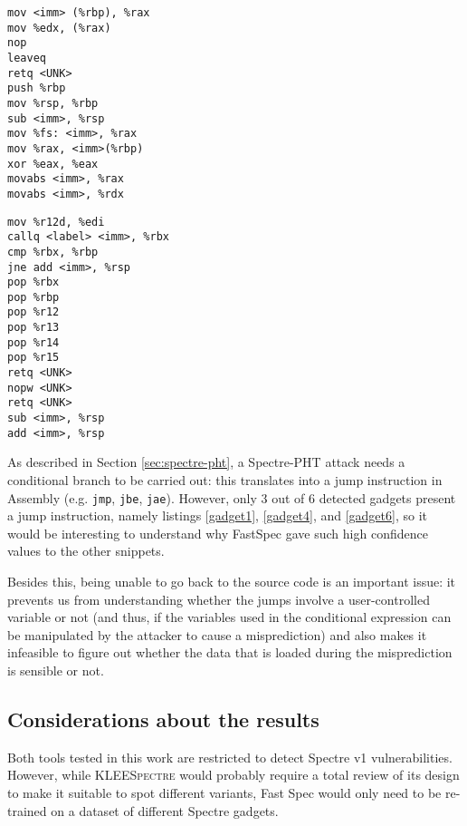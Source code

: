 \documentclass[12pt,a4paper]{book}
\theoremstyle{definition}
\begin{document}
	\begin{minipage}{.45\textwidth}
		\begin{lstlisting}[caption={Window 11598-11601}, label=gadget5]
mov <imm> (%rbp), %rax
mov %edx, (%rax)
nop
leaveq
retq <UNK>
push %rbp
mov %rsp, %rbp
sub <imm>, %rsp
mov %fs: <imm>, %rax
mov %rax, <imm>(%rbp)
xor %eax, %eax
movabs <imm>, %rax
movabs <imm>, %rdx
		\end{lstlisting}
	\end{minipage}\hfill
	\begin{minipage}{.45\textwidth}
		\begin{lstlisting}[basicstyle=\footnotesize\ttfamily, caption={Window 11868-11902}, label=gadget6, numbers=right]
mov %r12d, %edi
callq <label> <imm>, %rbx
cmp %rbx, %rbp
jne add <imm>, %rsp
pop %rbx
pop %rbp
pop %r12
pop %r13
pop %r14
pop %r15
retq <UNK>
nopw <UNK>
retq <UNK>
sub <imm>, %rsp
add <imm>, %rsp
		\end{lstlisting}
	\end{minipage}
	\vspace{3mm}
	
	As described in Section \ref{sec:spectre-pht}, a Spectre-PHT attack needs a conditional branch to be carried out: this translates into a jump instruction in Assembly (e.g. \texttt{jmp}, \texttt{jbe}, \texttt{jae}). However, only 3 out of 6 detected gadgets present a jump instruction, namely listings \ref{gadget1}, \ref{gadget4}, and \ref{gadget6}, so it would be interesting to understand why FastSpec gave such high confidence values to the other snippets. 
	
	Besides this, being unable to go back to the source code is an important issue: it prevents us from understanding whether the jumps involve a user-controlled variable or not (and thus, if the variables used in the conditional expression can be manipulated by the attacker to cause a misprediction) and also makes it infeasible to figure out whether the data that is loaded during the misprediction is sensible or not. 
	\subsection{Considerations about the results}\label{sec:final}
	Both tools tested in this work are restricted to detect Spectre v1 vulnerabilities. However, while \textsc{KLEESpectre} would probably require a total review of its design to make it suitable to spot different variants, Fast Spec would only need to be re-trained on a dataset of different Spectre gadgets. 
	
\end{document}
